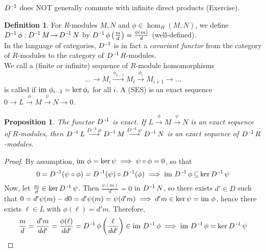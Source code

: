 \documentclass[11pt]{book}
\newcounter{counter}
\newtheorem{proposition}[counter]{Proposition}   \newtheorem{problem}[counter]{Problem}   \newtheorem*{proposition*}{Proposition}   \newtheorem*{lemma*}{Lemma}
\theoremstyle{definition}   \newtheorem{defn}[counter]{Definition} %
\newcommand{\mses}[5]{0 \longrightarrow #1 \overset{#2}{\longrightarrow} #3 \overset{#4}{\longrightarrow} #5 \longrightarrow 0}
\DeclareMathOperator{\ra}{\rightarrow}   \DeclareMathOperator{\Poly}{\mathbf{P}}   \DeclareMathOperator{\spn}{\textnormal{span}}   \DeclareMathOperator{\aut}{\textnormal{Aut}}
\newcommand{\vs}{\vspace{8pt}}
\numberwithin{counter}{chapter}
\begin{document}
\vs

\begin{remark}
$D\operatorname{^{-1}}$ does NOT generally commute with infinite direct products (Exercise).
\end{remark}

\vs

\begin{defn}
For $R$-modules $M,N$ and $\phi \in \hom_R(M,N)$, we define $D\inv \phi : D\inv M \ra D\inv N$ by $D\operatorname{^{-1}}\phi \left(\frac{m}{d}\right) = \frac{\phi(m)}{d}$ (well-defined). \\

In the language of categories, $D\operatorname{^{-1}}$ is in fact a \emph{covariant functor} from the category of $R$-modules to the category of $D\operatorname{^{-1}} R$-modules. \\

We call a (finite or infinite) sequence of $R$-module homomorphisms
\[...\longrightarrow M_i \overset{\phi_{I-1}}{\longrightarrow} M_i \overset{\phi_i}{\longrightarrow} M_{i+1} \longrightarrow \dots \]
is called  if $\textnormal{im } \phi_{i-1} = \ker \phi_i$ for all $i$. A  (SES) is an exact sequence \\ $\mses{L}{\phi}{M}{\psi}{N}$.
\end{defn}

\vs

\begin{proposition}
The functor $D\operatorname{^{-1}}$ is exact. If $L \overset{\phi}{\longrightarrow} M \overset{\psi}{\longrightarrow} N$ is an exact sequence of $R$-modules, then $D\operatorname{^{-1}} L \overset{D\operatorname{^{-1}} \phi}{\longrightarrow} D\operatorname{^{-1}} M \overset{D\operatorname{^{-1}} \psi}{\longrightarrow} D\operatorname{^{-1}} N$ is an exact sequence of $D\operatorname{^{-1}} R$-modules.
\end{proposition}

\begin{proof}
By assumption, $\textnormal{im } \phi = \ker \psi \implies \psi \circ \phi = 0$, so that
	\[0 = D\operatorname{^{-1}}(\psi \circ \phi) = D\operatorname{^{-1}}(\psi) \circ D\operatorname{^{-1}}(\phi) \implies \textnormal{im } D\operatorname{^{-1}} \phi \operatorname{\subseteq} \ker D\operatorname{^{-1}} \psi \]
Now, let $\frac{m}{d} \in \ker D\operatorname{^{-1}} \psi$. Then $\frac{\psi(m)}{d} = 0$ in $D\operatorname{^{-1}} N$, so there exists $d' \in D$ such that $0 = d'\psi(m) - d0 = d'\psi(m) = \psi(d'm) \implies d'm \in \ker \psi = \textnormal{im } \phi$, hence there exists $\ell \in L$ with $\phi(\ell) = d'm$. Therefore,
	\[\frac{m}{d} = \frac{d'm}{dd'} = \frac{\phi(\ell)}{dd'} = D\operatorname{^{-1}} \phi \left(\frac{\ell}{dd'} \right) \in \textnormal{im } D\operatorname{^{-1}} \phi \implies \textnormal{im } D\operatorname{^{-1}} \phi = \ker D\operatorname{^{-1}} \psi \]
\end{proof}
\end{document}
